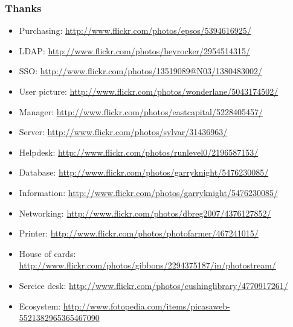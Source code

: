\documentclass{beamer}
\begin{document}
\begin{frame}
    \frametitle{Thanks}

        \begin{itemize}
                \item Purchasing: \url{http://www.flickr.com/photos/epsos/5394616925/}
                \item LDAP: \url{http://www.flickr.com/photos/heyrocker/2954514315/}
                \item SSO: \url{http://www.flickr.com/photos/13519089@N03/1380483002/}
                \item User picture: \url{http://www.flickr.com/photos/wonderlane/5043174502/}
                \item Manager: \url{http://www.flickr.com/photos/eastcapital/5228405457/}
                \item Server: \url{http://www.flickr.com/photos/sylvar/31436963/}
                \item Helpdesk: \url{http://www.flickr.com/photos/runlevel0/2196587153/}
                \item Database: \url{http://www.flickr.com/photos/garryknight/5476230085/}
                \item Information: \url{http://www.flickr.com/photos/garryknight/5476230085/}
                \item Networking: \url{http://www.flickr.com/photos/dbreg2007/4376127852/}
                \item Printer: \url{http://www.flickr.com/photos/photofarmer/467241015/}
                \item House of cards: \url{http://www.flickr.com/photos/gibbons/2294375187/in/photostream/}
                \item Sercice desk: \url{http://www.flickr.com/photos/cushinglibrary/4770917261/}
                \item Ecosystem: \url{http://www.fotopedia.com/items/picasaweb-5521382965365467090}
        \end{itemize}

\end{frame}
\end{document}

